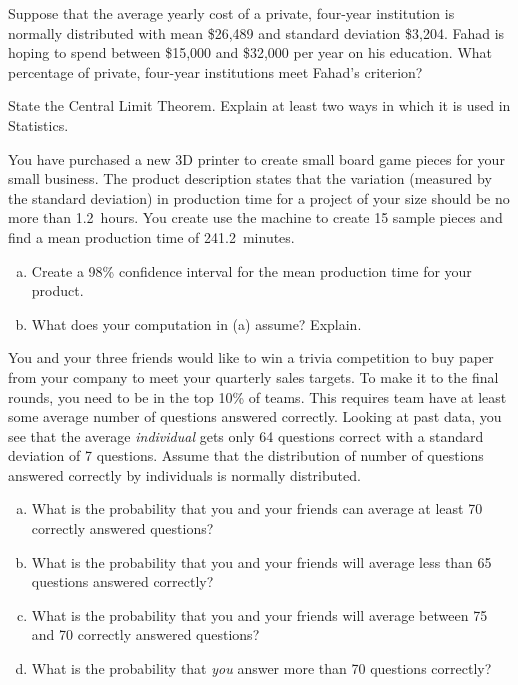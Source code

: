 \documentclass[11pt,letterpaper]{article}
\begin{document}

 Suppose that the average yearly cost of a private, four-year institution is normally distributed with mean \$26,489 and standard deviation \$3,204. Fahad is hoping to spend between \$15,000 and \$32,000 per year on his education. What percentage of private, four-year institutions meet Fahad's criterion? 



\newpage



 State the Central Limit Theorem. Explain at least two ways in which it is used in Statistics. 



\newpage



 You have purchased a new 3D printer to create small board game pieces for your small business. The product description states that the variation (measured by the standard deviation) in production time for a project of your size should be no more than 1.2~hours. You create use the machine to create 15 sample pieces and find a mean production time of 241.2~minutes. 
	\begin{enumerate}[(a)]
	\item Create a 98\% confidence interval for the mean production time for your product. 
	\item What does your computation in (a) assume? Explain. 
	\end{enumerate}



\newpage



 You and your three friends would like to win a trivia competition to buy paper from your company to meet your quarterly sales targets. To make it to the final rounds, you need to be in the top 10\% of teams. This requires team have at least some average number of questions answered correctly. Looking at past data, you see that the average \textit{individual} gets only 64 questions correct with a standard deviation of 7 questions. Assume that the distribution of number of questions answered correctly by individuals is normally distributed. 
	\begin{enumerate}[(a)]
	\item What is the probability that you and your friends can average at least 70 correctly answered questions?
	\item What is the probability that you and your friends will average less than 65 questions answered correctly?
	\item What is the probability that you and your friends will average between 75 and 70 correctly answered questions?
	\item What is the probability that \textit{you} answer more than 70 questions correctly? 
	\end{enumerate}
\end{document}

